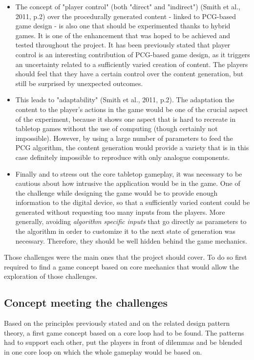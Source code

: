 \begin{itemize}
\item The concept of "player control" (both "direct" and "indirect") (Smith et al., 2011, p.2)\cite{pdf:pcgbased} over the procedurally generated content - linked to PCG-based game design - is also one that should be experimented thanks to hybrid games. It is one of the enhancement that was hoped to be achieved and tested throughout the project. It has been previously stated that player control is an interesting contribution of PCG-based game design, as it triggers an uncertainty related to a sufficiently varied creation of content. The players should feel that they have a certain control over the content generation, but still be surprised by unexpected outcomes.
\item This leads to "adaptability" (Smith et al., 2011, p.2). The adaptation the content to the player's actions in the game would be one of the crucial aspect of the experiment, because it shows one aspect that is hard to recreate in tabletop games without the use of computing (though certainly not impossible). However, by using a large number of parameters to feed the PCG algorithm, the content generation would provide a variety that is in this case definitely impossible to reproduce with only analogue components.
\item Finally and to stress out the core tabletop gameplay, it was necessary to be cautious about how intrusive the application would be in the game. One of the challenge while designing the game would be to provide enough information to the digital device, so that a sufficiently varied content could be generated without requesting too many inputs from the players. More generally, avoiding \textit{algorithm specific inputs} that go directly as parameters to the algorithm in order to customize it to the next state of generation was necessary. Therefore, they should be well hidden  behind the game mechanics.
\end{itemize}
Those challenges were the main ones that the project should cover. To do so first required to find a game concept based on core mechanics that would allow the exploration of those challenges.
\subsection{Concept meeting the challenges}
Based on the principles previously stated and on the related design pattern theory, a first game concept based on a core loop had to be found. The patterns had to support each other, put the players in front of dilemmas and be blended in one core loop on which the whole gameplay would be based on. 
